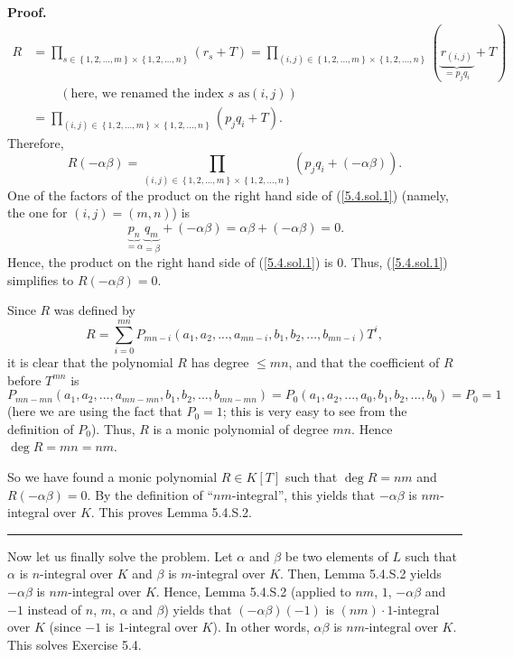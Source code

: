\documentclass[numbers=enddot,12pt,final,onecolumn,notitlepage]{scrartcl}%
\newenvironment{proof}[1][Proof]{\noindent\textbf{#1.} }{\ \rule{0.5em}{0.5em}}
\begin{document}
\begin{proof}
\begin{align*}
R  &  =\prod\limits_{s\in\left\{  1,2,...,m\right\}  \times\left\{
1,2,...,n\right\}  }\left(  r_{s}+T\right)  =\prod\limits_{\left(  i,j\right)
\in\left\{  1,2,...,m\right\}  \times\left\{  1,2,...,n\right\}  }\left(
\underbrace{r_{\left(  i,j\right)  }}_{=p_{j}q_{i}}+T\right) \\
&  \ \ \ \ \ \ \ \ \ \ \left(  \text{here, we renamed the index }s\text{ as
}\left(  i,j\right)  \right) \\
&  =\prod\limits_{\left(  i,j\right)  \in\left\{  1,2,...,m\right\}
\times\left\{  1,2,...,n\right\}  }\left(  p_{j}q_{i}+T\right)  .
\end{align*}
Therefore,%
\begin{equation}
R\left(  -\alpha\beta\right)  =\prod\limits_{\left(  i,j\right)  \in\left\{
1,2,...,m\right\}  \times\left\{  1,2,...,n\right\}  }\left(  p_{j}%
q_{i}+\left(  -\alpha\beta\right)  \right)  . \label{5.4.sol.1}%
\end{equation}
One of the factors of the product on the right hand side of (\ref{5.4.sol.1})
(namely, the one for $\left(  i,j\right)  =\left(  m,n\right)  $) is%
\[
\underbrace{p_{n}}_{=\alpha}\underbrace{q_{m}}_{=\beta}+\left(  -\alpha
\beta\right)  =\alpha\beta+\left(  -\alpha\beta\right)  =0.
\]
Hence, the product on the right hand side of (\ref{5.4.sol.1}) is $0$. Thus,
(\ref{5.4.sol.1}) simplifies to $R\left(  -\alpha\beta\right)  =0$.

Since $R$ was defined by
\[
R=\sum\limits_{i=0}^{mn}P_{mn-i}\left(  a_{1},a_{2},...,a_{mn-i},b_{1}%
,b_{2},...,b_{mn-i}\right)  T^{i},
\]
it is clear that the polynomial $R$ has degree $\leq mn$, and that the
coefficient of $R$ before $T^{mn}$ is%
\[
P_{mn-mn}\left(  a_{1},a_{2},...,a_{mn-mn},b_{1},b_{2},...,b_{mn-mn}\right)
=P_{0}\left(  a_{1},a_{2},...,a_{0},b_{1},b_{2},...,b_{0}\right)  =P_{0}=1
\]
(here we are using the fact that $P_{0}=1$; this is very easy to see from the
definition of $P_{0}$). Thus, $R$ is a monic polynomial of degree $mn$. Hence
$\deg R=mn=nm$.

So we have found a monic polynomial $R\in K\left[  T\right]  $ such that $\deg
R=nm$ and $R\left(  -\alpha\beta\right)  =0$. By the definition of
``$nm$-integral'', this yields that $-\alpha\beta$ is $nm$-integral over $K$.
This proves Lemma 5.4.S.2.
\end{proof}

Now let us finally solve the problem. Let $\alpha$ and $\beta$ be two elements
of $L$ such that $\alpha$ is $n$-integral over $K$ and $\beta$ is $m$-integral
over $K$. Then, Lemma 5.4.S.2 yields $-\alpha\beta$ is $nm$-integral over $K$.
Hence, Lemma 5.4.S.2 (applied to $nm$, $1$, $-\alpha\beta$ and $-1$ instead of
$n$, $m$, $\alpha$ and $\beta$) yields that $\left(  -\alpha\beta\right)
\left(  -1\right)  $ is $\left(  nm\right)  \cdot1$-integral over $K$ (since
$-1$ is $1$-integral over $K$). In other words, $\alpha\beta$ is $nm$-integral
over $K$. This solves Exercise 5.4.
\end{document}

